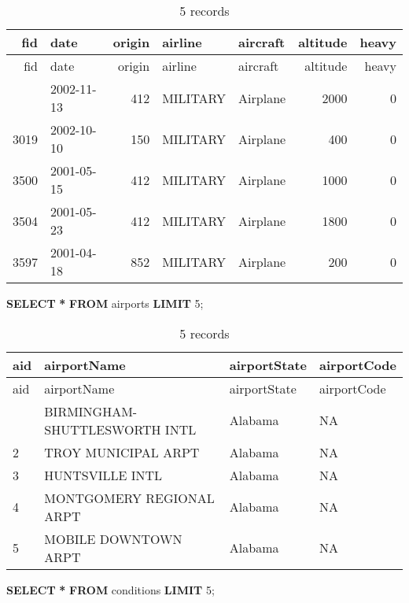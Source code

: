 \documentclass[
]{article}
\newenvironment{Shaded}{\begin{snugshade}}{\end{snugshade}}
\newcommand{\DecValTok}[1]{\textcolor[rgb]{0.00,0.00,0.81}{#1}}
\newcommand{\KeywordTok}[1]{\textcolor[rgb]{0.13,0.29,0.53}{\textbf{#1}}}
\newcommand{\NormalTok}[1]{#1}
\newcommand{\OperatorTok}[1]{\textcolor[rgb]{0.81,0.36,0.00}{\textbf{#1}}}
\begin{document}
\begin{longtable}[]{@{}rlrllrr@{}}
\caption{5 records}\tabularnewline
\toprule\noalign{}
fid & date & origin & airline & aircraft & altitude & heavy \\
\midrule\noalign{}
\endfirsthead
\toprule\noalign{}
fid & date & origin & airline & aircraft & altitude & heavy \\
\midrule\noalign{}
\endhead
\bottomrule\noalign{}
\endlastfoot
1195 & 2002-11-13 & 412 & MILITARY & Airplane & 2000 & 0 \\
3019 & 2002-10-10 & 150 & MILITARY & Airplane & 400 & 0 \\
3500 & 2001-05-15 & 412 & MILITARY & Airplane & 1000 & 0 \\
3504 & 2001-05-23 & 412 & MILITARY & Airplane & 1800 & 0 \\
3597 & 2001-04-18 & 852 & MILITARY & Airplane & 200 & 0 \\
\end{longtable}

\begin{Shaded}
\begin{Highlighting}[]
\KeywordTok{SELECT} \OperatorTok{*} \KeywordTok{FROM}\NormalTok{ airports }\KeywordTok{LIMIT} \DecValTok{5}\NormalTok{;}
\end{Highlighting}
\end{Shaded}

\begin{longtable}[]{@{}llll@{}}
\caption{5 records}\tabularnewline
\toprule\noalign{}
aid & airportName & airportState & airportCode \\
\midrule\noalign{}
\endfirsthead
\toprule\noalign{}
aid & airportName & airportState & airportCode \\
\midrule\noalign{}
\endhead
\bottomrule\noalign{}
\endlastfoot
1 & BIRMINGHAM-SHUTTLESWORTH INTL & Alabama & NA \\
2 & TROY MUNICIPAL ARPT & Alabama & NA \\
3 & HUNTSVILLE INTL & Alabama & NA \\
4 & MONTGOMERY REGIONAL ARPT & Alabama & NA \\
5 & MOBILE DOWNTOWN ARPT & Alabama & NA \\
\end{longtable}

\begin{Shaded}
\begin{Highlighting}[]
\KeywordTok{SELECT} \OperatorTok{*} \KeywordTok{FROM}\NormalTok{ conditions }\KeywordTok{LIMIT} \DecValTok{5}\NormalTok{;}
\end{Highlighting}
\end{Shaded}
\end{document}
